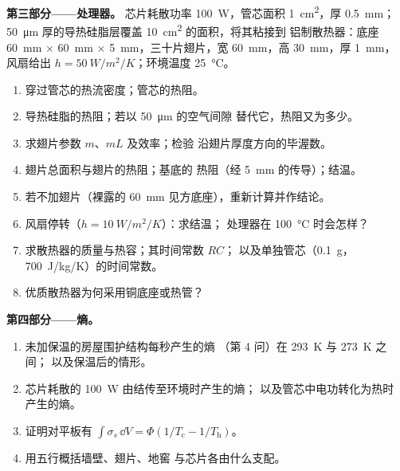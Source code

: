 \begin{problem}
\textbf{第三部分——处理器。}
芯片耗散功率 \qty{100}{W}，管芯面积 \qty{1}{cm^2}，厚 \qty{0.5}{mm}；
\qty{50}{\micro m} 厚的导热硅脂层覆盖 \qty{10}{cm^2} 的面积，将其粘接到
铝制散热器：底座 \qty{60}{mm} $\times$ \qty{60}{mm} $\times$
\qty{5}{mm}，三十片翅片，宽 \qty{60}{mm}，高 \qty{30}{mm}，厚 \qty{1}{mm}，
风扇给出 $h = \qty{50}{W/m^2/K}$；环境温度 \qty{25}{\celsius}。
\begin{enumerate}[resume]
  \item 穿过管芯的热流密度；管芯的热阻。
  \item 导热硅脂的热阻；若以 \qty{50}{\micro m} 的空气间隙
        替代它，热阻又为多少。
  \item 求翅片参数 $m$、$mL$ 及效率；检验
        沿翅片厚度方向的毕渥数。
  \item 翅片总面积与翅片的热阻；基底的
        热阻（经 \qty{5}{mm} 的传导）；结温。
  \item 若不加翅片（裸露的 \qty{60}{mm} 见方底座），重新计算并作结论。
  \item 风扇停转（$h = \qty{10}{W/m^2/K}$）：求结温；
        处理器在 \qty{100}{\celsius} 时会怎样？
  \item 求散热器的质量与热容；其时间常数 $RC$；
        以及单独管芯（\qty{0.1}{g}，\qty{700}{J/kg/K}）的时间常数。
  \item 优质散热器为何采用铜底座或热管？
\end{enumerate}

\textbf{第四部分——熵。}
\begin{enumerate}[resume]
  \item 未加保温的房屋围护结构每秒产生的熵
        （第 4 问）在 \qty{293}{K} 与 \qty{273}{K} 之间；
        以及保温后的情形。
  \item 芯片耗散的 \qty{100}{W} 由结传至环境时产生的熵；
        以及管芯中电功转化为热时
        产生的熵。
  \item 证明对平板有 $\int\sigma_s\,\dd V = \Phi(1/T_{\text{c}} -
        1/T_{\text{h}})$。
  \item 用五行概括墙壁、翅片、地窖
        与芯片各由什么支配。
\end{enumerate}
\end{problem}
